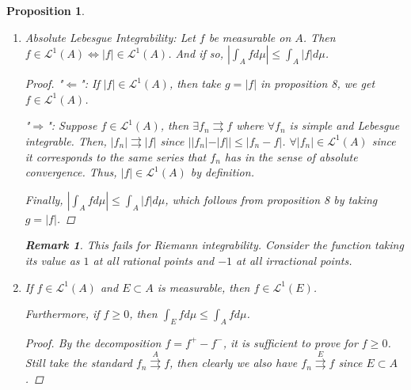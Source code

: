 \documentclass[12pt]{article}
\theoremstyle{blueplain}
\newtheorem{proposition}[theorem]{Proposition}
\theoremstyle{bluedef}
\theoremstyle{blueremark}
\newtheorem{remark}{Remark}[section]
\newcommand{\N}{\mathbb{N}}
\numberwithin{equation}{section}
\begin{document}
\begin{proposition}
\begin{enumerate}
\begin{proof}
            So, from now on, we assume $f \geq 0$.

            Choose $f_n \rightrightarrows f$ where $\forall f_n$ is simple and measurable $\forall n \geq N$ for some $N \in \N$, and $\{f_n\}$ is non-decreasing.

            Choose $g_n \rightrightarrows f$ where $\forall g_n$ is simple and $g_n \in \mathcal{L}^1(A), \forall n \geq N$ for the same $N$, and $\{g_n\}$ is non-increasing. Thus, we have $0 \leq f_n \leq g_n$ but $g_n \in \mathcal{L}^1(A) \implies f_n \in \mathcal{L}^1(A)$ by being restricted by an upper bound and $\int_A f_n d\mu \leq \int_A g d\mu \implies$ passing to limit, $\int_A f d\mu \leq \int_A g d\mu$.
          \end{proof}

    \item Absolute Lebesgue Integrability: Let $f$ be measurable on $A$. Then $f \in \mathcal{L}^1(A) \Leftrightarrow |f| \in \mathcal{L}^1(A)$. And if so, $|\int_A f d\mu| \leq \int_A |f| d\mu$.
          \begin{proof}
            "$\Leftarrow$": If $|f| \in \mathcal{L}^1(A)$, then take $g = |f|$ in proposition 8, we get $f \in \mathcal{L}^1(A)$.

            "$\Rightarrow$": Suppose $f \in \mathcal{L}^1(A)$, then $\exists f_n \rightrightarrows f$ where $\forall f_n$ is simple and Lebesgue integrable. Then, $|f_n| \rightrightarrows |f|$ since $||f_n| - |f|| \leq |f_n - f|$. $\forall |f_n| \in \mathcal{L}^1(A)$ since it corresponds to the same series that $f_n$ has in the sense of absolute convergence. Thus, $|f| \in \mathcal{L}^1(A)$ by definition.

            Finally, $|\int_A f d\mu| \leq \int_A |f| d\mu$, which follows from proposition 8 by taking $g = |f|$.

          \end{proof}
          \begin{remark}
            This fails for Riemann integrability. Consider the function taking its value as $1$ at all rational points and $-1$ at all irractional points.
          \end{remark}

    \item If $f \in \mathcal{L}^1(A)$ and $E \subset A$ is measurable, then $f \in \mathcal{L}^1(E)$.

          Furthermore, if $f \geq 0$, then $\int_E f d\mu \leq \int_A f d\mu$.
          \begin{proof}
            By the decomposition $f = f^+ - f^-$, it is sufficient to prove for $f \geq 0$. Still take the standard $f_n \overset{A}{\rightrightarrows} f$, then clearly we also have $f_n \overset{E}{\rightrightarrows} f$ since $E \subset A$.


\end{proof}
\end{enumerate}
\end{proposition}
\end{document}
